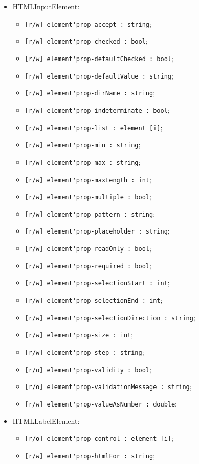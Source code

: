 \documentclass[a4paper, 14pt]{extarticle}
\newenvironment{icItems}
	{ \begin{itemize} [noitemsep,nolistsep] }
	{ \end{itemize} }
\begin{document}
\begin{icItems}
	\item HTMLInputElement:
	\begin{icItems}
		\item \lstinline|[r/w] element'prop-accept : string|;
		\item \lstinline|[r/w] element'prop-checked : bool|;
		\item \lstinline|[r/w] element'prop-defaultChecked : bool|;
		\item \lstinline|[r/w] element'prop-defaultValue : string|;
		\item \lstinline|[r/w] element'prop-dirName : string|;
		\item \lstinline|[r/w] element'prop-indeterminate : bool|;
		\item \lstinline|[r/w] element'prop-list : element [i]|;
		\item \lstinline|[r/w] element'prop-min : string|;
		\item \lstinline|[r/w] element'prop-max : string|;
		\item \lstinline|[r/w] element'prop-maxLength : int|;
		\item \lstinline|[r/w] element'prop-multiple : bool|;
		\item \lstinline|[r/w] element'prop-pattern : string|;
		\item \lstinline|[r/w] element'prop-placeholder : string|;
		\item \lstinline|[r/w] element'prop-readOnly : bool|;
		\item \lstinline|[r/w] element'prop-required : bool|;
		\item \lstinline|[r/w] element'prop-selectionStart : int|;
		\item \lstinline|[r/w] element'prop-selectionEnd : int|;
		\item \lstinline|[r/w] element'prop-selectionDirection : string|;
		\item \lstinline|[r/w] element'prop-size : int|;
		\item \lstinline|[r/w] element'prop-step : string|;
		\item \lstinline|[r/o] element'prop-validity : bool|;
		\item \lstinline|[r/o] element'prop-validationMessage : string|;
		\item \lstinline|[r/w] element'prop-valueAsNumber : double|;
	\end{icItems}
	
	\item HTMLLabelElement:
	\begin{icItems}
		\item \lstinline|[r/o] element'prop-control : element [i]|;
		\item \lstinline|[r/w] element'prop-htmlFor : string|;
	\end{icItems}
	

\end{icItems}
\end{document}
